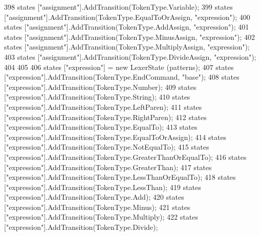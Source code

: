 \begin{DoxyCode}
398             states [\textcolor{stringliteral}{"assignment"}].AddTransition(TokenType.Variable);
399             states [\textcolor{stringliteral}{"assignment"}].AddTransition(TokenType.EqualToOrAssign, \textcolor{stringliteral}{"expression"});
400             states [\textcolor{stringliteral}{"assignment"}].AddTransition(TokenType.AddAssign, \textcolor{stringliteral}{"expression"});
401             states [\textcolor{stringliteral}{"assignment"}].AddTransition(TokenType.MinusAssign, \textcolor{stringliteral}{"expression"});
402             states [\textcolor{stringliteral}{"assignment"}].AddTransition(TokenType.MultiplyAssign, \textcolor{stringliteral}{"expression"});
403             states [\textcolor{stringliteral}{"assignment"}].AddTransition(TokenType.DivideAssign, \textcolor{stringliteral}{"expression"});
404 
405 
406             states [\textcolor{stringliteral}{"expression"}] = \textcolor{keyword}{new} LexerState (patterns);
407             states [\textcolor{stringliteral}{"expression"}].AddTransition(TokenType.EndCommand, \textcolor{stringliteral}{"base"});
408             states [\textcolor{stringliteral}{"expression"}].AddTransition(TokenType.Number);
409             states [\textcolor{stringliteral}{"expression"}].AddTransition(TokenType.String);
410             states [\textcolor{stringliteral}{"expression"}].AddTransition(TokenType.LeftParen);
411             states [\textcolor{stringliteral}{"expression"}].AddTransition(TokenType.RightParen);
412             states [\textcolor{stringliteral}{"expression"}].AddTransition(TokenType.EqualTo);
413             states [\textcolor{stringliteral}{"expression"}].AddTransition(TokenType.EqualToOrAssign);
414             states [\textcolor{stringliteral}{"expression"}].AddTransition(TokenType.NotEqualTo);
415             states [\textcolor{stringliteral}{"expression"}].AddTransition(TokenType.GreaterThanOrEqualTo);
416             states [\textcolor{stringliteral}{"expression"}].AddTransition(TokenType.GreaterThan);
417             states [\textcolor{stringliteral}{"expression"}].AddTransition(TokenType.LessThanOrEqualTo);
418             states [\textcolor{stringliteral}{"expression"}].AddTransition(TokenType.LessThan);
419             states [\textcolor{stringliteral}{"expression"}].AddTransition(TokenType.Add);
420             states [\textcolor{stringliteral}{"expression"}].AddTransition(TokenType.Minus);
421             states [\textcolor{stringliteral}{"expression"}].AddTransition(TokenType.Multiply);
422             states [\textcolor{stringliteral}{"expression"}].AddTransition(TokenType.Divide);

\end{DoxyCode}
